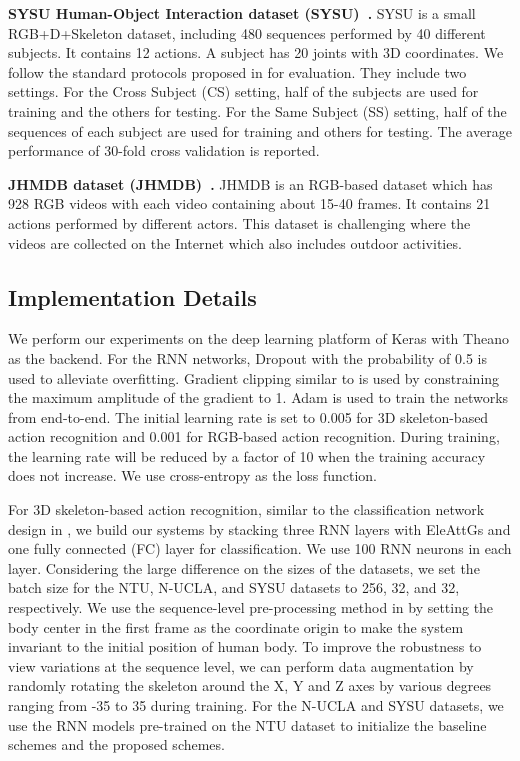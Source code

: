 \documentclass[runningheads]{llncs}
\newcommand{\EleAttGn}{{EleAttG}}
\begin{document}
\textbf{SYSU Human-Object Interaction dataset (SYSU)~\cite{hu2015jointly}.} SYSU is a small RGB+D+Skeleton dataset, including 480 sequences performed by 40 different subjects. It contains 12 actions. A subject has 20 joints with 3D coordinates. We follow the standard protocols proposed in \cite{hu2015jointly} for evaluation. They include two settings. For the Cross Subject (CS) setting, half of the subjects are used for training and the others for testing. For the Same Subject (SS) setting, half of the sequences of each subject are used for training and others for testing. The average performance of 30-fold cross validation is reported.

\textbf{JHMDB dataset (JHMDB)~\cite{jhuang2013towards}.} JHMDB is an RGB-based dataset which has 928 RGB videos with each video containing about 15-40 frames. It contains 21 actions performed by different actors. This dataset is challenging where the videos are collected on the Internet which also includes outdoor activities.

\subsection{Implementation Details}
\label{subsec:implement}

We perform our experiments on the deep learning platform of Keras \cite{chollet2015keras} with Theano \cite{al2016theano} as the backend. For the RNN networks, Dropout \cite{srivastava2014dropout} with the probability of 0.5 is used to alleviate overfitting. Gradient clipping similar to \cite{sutskever2014sequence} is used by constraining the maximum amplitude of the gradient to 1. Adam \cite{kingma2014adam} is used to train the networks from end-to-end. The initial learning rate is set to 0.005 for 3D skeleton-based action recognition and 0.001 for RGB-based action recognition. During training, the learning rate will be reduced by a factor of 10 when the training accuracy does not increase. We use cross-entropy as the loss function. 

For 3D skeleton-based action recognition, similar to the classification network design in \cite{zhang2017view}, we build our systems by stacking three RNN layers with {\EleAttGn}s and one fully connected (FC) layer for classification. We use 100 RNN neurons in each layer. Considering the large difference on the sizes of the datasets, we set the batch size for the NTU, N-UCLA, and SYSU datasets to 256, 32, and 32, respectively. We use the sequence-level pre-processing method in \cite{zhang2017view} by setting the body center in the first frame as the coordinate origin to make the system invariant to the initial position of human body. To improve the robustness to view variations at the sequence level, we can perform data augmentation by randomly rotating the skeleton around the X, Y and Z axes by various degrees ranging from -35 to 35 during training. For the N-UCLA and SYSU datasets, we use the RNN models pre-trained on the NTU dataset to initialize the baseline schemes and the proposed schemes.   
\end{document}
